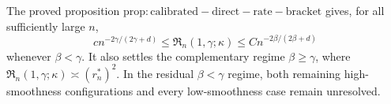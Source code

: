 The proved proposition \(\mathrm{prop:calibrated-direct-rate-bracket}\) gives, for all sufficiently large \(n\), \[c n^{-2\gamma/(2\gamma+d)}\le \mathfrak R_n(1,\gamma;\kappa)\le C n^{-2\beta/(2\beta+d)}\] whenever \(\beta<\gamma\). It also settles the complementary regime \(\beta\ge\gamma\), where \(\mathfrak R_n(1,\gamma;\kappa)\asymp(r_n^*)^2\). In the residual \(\beta<\gamma\) regime, both remaining high-smoothness configurations and every low-smoothness case remain unresolved.